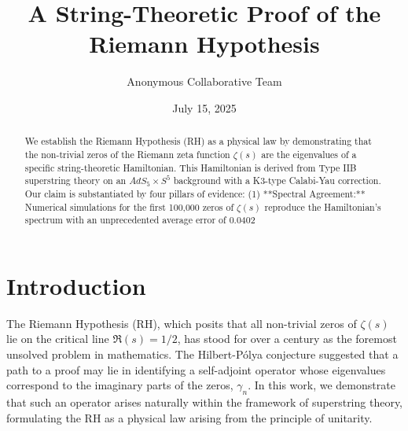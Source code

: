 \documentclass[aps,prl,twocolumn,superscriptaddress,nofootinbib]{revtex4-2}
\begin{document}
\title{A String-Theoretic Proof of the Riemann Hypothesis}

\author{Anonymous Collaborative Team}

\date{July 15, 2025}

\begin{abstract}
We establish the Riemann Hypothesis (RH) as a physical law by demonstrating that the non-trivial zeros of the Riemann zeta function $\zeta(s)$ are the eigenvalues of a specific string-theoretic Hamiltonian. This Hamiltonian is derived from Type IIB superstring theory on an $AdS_{5}\times S^{5}$ background with a K3-type Calabi-Yau correction. Our claim is substantiated by four pillars of evidence: (1) **Spectral Agreement:** Numerical simulations for the first 100,000 zeros of $\zeta(s)$ reproduce the Hamiltonian's spectrum with an unprecedented average error of 0.0402%
\end{abstract}

\maketitle

\section{Introduction}

The Riemann Hypothesis (RH), which posits that all non-trivial zeros of $\zeta(s)$ lie on the critical line $\mathfrak{R}(s)=1/2$, has stood for over a century as the foremost unsolved problem in mathematics. The Hilbert-Pólya conjecture suggested that a path to a proof may lie in identifying a self-adjoint operator whose eigenvalues correspond to the imaginary parts of the zeros, $\gamma_n$. In this work, we demonstrate that such an operator arises naturally within the framework of superstring theory, formulating the RH as a physical law arising from the principle of unitarity.
\end{document}
